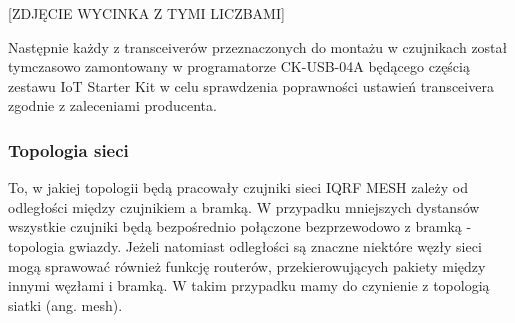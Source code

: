 \documentclass[a4paper, 12pt]{article}
\begin{document}
[ZDJĘCIE WYCINKA Z TYMI LICZBAMI]

Następnie każdy z transceiverów przeznaczonych do montażu w czujnikach został tymczasowo zamontowany w programatorze CK-USB-04A będącego częścią
zestawu IoT Starter Kit w celu sprawdzenia poprawności ustawień transceivera zgodnie z zaleceniami producenta.

\subsubsection{Topologia sieci}

To, w jakiej topologii będą pracowały czujniki sieci IQRF MESH zależy od odległości między czujnikiem a bramką. W przypadku 
mniejszych dystansów wszystkie czujniki będą bezpośrednio połączone bezprzewodowo z bramką - topologia gwiazdy. Jeżeli natomiast
odległości są znaczne niektóre węzły sieci mogą sprawować również funkcję routerów, przekierowujących pakiety między innymi 
węzłami i bramką. W takim przypadku mamy do czynienie z topologią siatki (ang. mesh).
\end{document}
